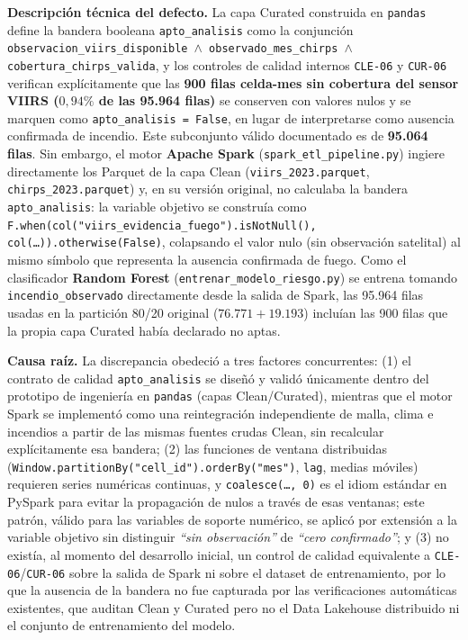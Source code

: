 \documentclass[11pt,a4paper]{article}
\begin{document}
\textbf{Descripci\'on t\'ecnica del defecto.} La capa Curated construida en \texttt{pandas} define la bandera booleana \texttt{apto\_analisis} como la conjunci\'on \texttt{observacion\_viirs\_disponible \(\wedge\) observado\_mes\_chirps \(\wedge\) cobertura\_chirps\_valida}, y los controles de calidad internos \texttt{CLE-06} y \texttt{CUR-06} verifican expl\'icitamente que las \textbf{900 filas celda-mes sin cobertura del sensor VIIRS ($0{,}94\%$ de las 95.964 filas)} se conserven con valores nulos y se marquen como \texttt{apto\_analisis = False}, en lugar de interpretarse como ausencia confirmada de incendio. Este subconjunto v\'alido documentado es de \textbf{95.064 filas}. Sin embargo, el motor \textbf{Apache Spark} (\texttt{spark\_etl\_pipeline.py}) ingiere directamente los Parquet de la capa Clean (\texttt{viirs\_2023.parquet}, \texttt{chirps\_2023.parquet}) y, en su versi\'on original, no calculaba la bandera \texttt{apto\_analisis}: la variable objetivo se construía como \texttt{F.when(col("viirs\_evidencia\_fuego").isNotNull(), col(\ldots)).otherwise(False)}, colapsando el valor nulo (sin observaci\'on satelital) al mismo s\'imbolo que representa la ausencia confirmada de fuego. Como el clasificador \textbf{Random Forest} (\texttt{entrenar\_modelo\_riesgo.py}) se entrena tomando \texttt{incendio\_observado} directamente desde la salida de Spark, las 95.964 filas usadas en la partici\'on 80/20 original ($76.771 + 19.193$) inclu\'ian las 900 filas que la propia capa Curated hab\'ia declarado no aptas.

\textbf{Causa ra\'iz.} La discrepancia obedeci\'o a tres factores concurrentes: (1) el contrato de calidad \texttt{apto\_analisis} se dise\~n\'o y valid\'o \'unicamente dentro del prototipo de ingenier\'ia en \texttt{pandas} (capas Clean/Curated), mientras que el motor Spark se implement\'o como una reintegraci\'on independiente de malla, clima e incendios a partir de las mismas fuentes crudas Clean, sin recalcular expl\'icitamente esa bandera; (2) las funciones de ventana distribuidas (\texttt{Window.partitionBy("cell\_id").orderBy("mes")}, \texttt{lag}, medias m\'oviles) requieren series num\'ericas continuas, y \texttt{coalesce(\ldots, 0)} es el idiom est\'andar en PySpark para evitar la propagaci\'on de nulos a trav\'es de esas ventanas; este patr\'on, v\'alido para las variables de soporte num\'erico, se aplic\'o por extensi\'on a la variable objetivo sin distinguir \textit{``sin observaci\'on''} de \textit{``cero confirmado''}; y (3) no exist\'ia, al momento del desarrollo inicial, un control de calidad equivalente a \texttt{CLE-06}/\texttt{CUR-06} sobre la salida de Spark ni sobre el dataset de entrenamiento, por lo que la ausencia de la bandera no fue capturada por las verificaciones autom\'aticas existentes, que auditan Clean y Curated pero no el Data Lakehouse distribuido ni el conjunto de entrenamiento del modelo.
\end{document}
